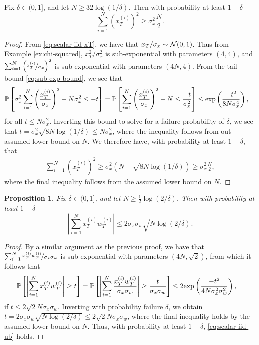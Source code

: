 \documentclass{article}[12pt]
\newtheorem{prop}{Proposition}
\begin{document}
\begin{proposition}
Fix $\delta \in (0,1]$, and let $N \geq 32 \log(1/\delta)$.  Then with probability at least $1-\delta$
\begin{equation}
\sum_{i=1}^N (x_T^{(i)})^2 \geq \sigma_x^2 \frac{N}{2}.
\label{eq:scalar-iid-lb}
\end{equation}
\label{prop:scalar-iid-lb}
\end{proposition}
\begin{proof}
From \eqref{eq:scalar-iid-xT}, we have that $x_T/\sigma_x \sim \mathcal{N}(0,1)$.  Thus from Example \ref{ex:chi-squared}, $x_T^2/\sigma_x^2$ is sub-exponential with parameters $(4,4)$, and 
$\sum_{i=1}^N \left(\nicefrac{x_T^{(i)}}{\sigma_x}\right)^2$
is sub-exponential with parameters $(4N,4)$.  From the tail bound \eqref{eq:sub-exp-bound}, we see that
\begin{align*}
&\mathbb{P}\left[\sigma_x^2\sum_{i=1}^N \left(\frac{x_T^{(i)}}{\sigma_x}\right)^2 - N\sigma_x^2 \leq -t \right] = \mathbb{P}\left[\sum_{i=1}^N \left(\frac{x_T^{(i)}}{\sigma_x}\right)^2 - N \leq \frac{-t}{\sigma_x^2}\right] \leq \mathrm{exp}\left(\frac{-t^2}{8N\sigma_x^4}\right),
\end{align*}
for all $t \leq N\sigma_x^2$.  Inverting this bound to solve for a failure probability of $\delta$, we see that $t = \sigma_x^2\sqrt{8N\log(1/\delta)} \leq N\sigma_x^2$, where the inequality follows from out assumed lower bound on $N$.  We therefore have, with probability at least $1-\delta$, that
\begin{align*}
\sum_{i=1}^N (x_T^{(i)})^2 \geq \sigma_x^2(N-\sqrt{8N\log(1/\delta)}) \geq \sigma_x^2\frac{N}{2},
\end{align*}
where the final inequality follows from the assumed lower bound on $N$.
\end{proof}

\begin{prop}
Fix $\delta \in (0,1]$, and let $N \geq \tfrac{1}{2} \log(2/\delta)$.  Then with probability at least $1-\delta$
\begin{equation}
\left|\sum_{i=1}^N x_T^{(i)}w_T^{(i)}\right| \leq 2\sigma_x\sigma_w \sqrt{N\log(2/\delta)}.
\label{eq:scalar-iid-ub}
\end{equation}
\label{prop:scalar-iid-ub}
\end{prop}
\begin{proof}
By a similar argument as the previous proof, we have that
$\sum_{i=1}^N \nicefrac{x_T^{(i)}w_T^{(i)}}{\sigma_x\sigma_w}$
is sub-exponential with parameters $(4N,\sqrt{2})$, from which it follows that
\begin{align*}
\mathbb{P}\left[ \left|\sum_{i=1}^N x_T^{(i)}w_T^{(i)}\right| \geq t\right] &= \mathbb{P}\left[\left|\sum_{i=1}^N \frac{x_T^{(i)}w_T^{(i)}}{\sigma_x\sigma_w}\right| \geq \frac{t}{\sigma_x\sigma_w}\right] \leq 2\mathrm{exp}\left(\frac{-t^2}{4N\sigma_x^2\sigma_w^2}\right),
\end{align*}
if $t\leq 2\sqrt{2}N\sigma_x\sigma_w$.  Inverting with probability failure $\delta$, we obtain $t = 2\sigma_x\sigma_w\sqrt{N\log(2/\delta)} \leq 2\sqrt{2}N\sigma_x\sigma_w$, where the final inequality holds by the assumed lower bound on $N$.  Thus, with probability at least $1-\delta$, \eqref{eq:scalar-iid-ub} holds.
\end{proof}
  
\end{document}
